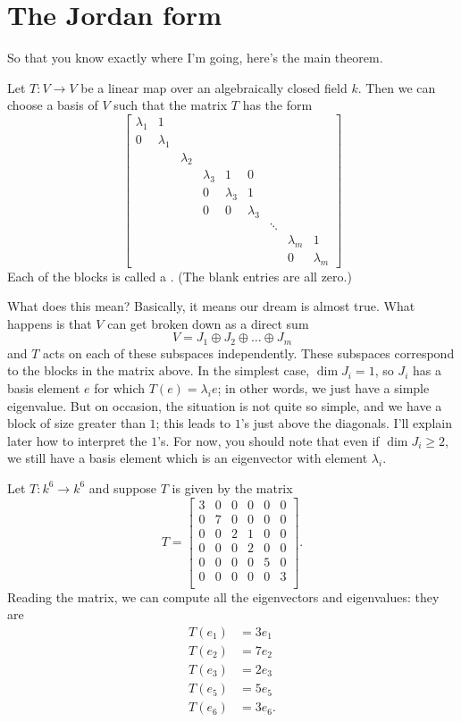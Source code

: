 \section{The Jordan form}
So that you know exactly where I'm going, here's the main theorem.
\begin{theorem}
	Let $T : V \to V$ be a linear map over an algebraically closed field $k$.
	Then we can choose a basis of $V$ such that the matrix $T$ has the form
	\[
	\begin{bmatrix}
		\lambda_1 & 1 \\
		0 & \lambda_1 \\
		&& \lambda_2 \\
		&&& \lambda_3 & 1 & 0 \\
		&&& 0 & \lambda_3 & 1 \\
		&&& 0 & 0 & \lambda_3 \\
		&&&&&& \ddots \\
		&&&&&&& \lambda_m & 1 \\
		&&&&&&& 0 & \lambda_m
	\end{bmatrix}
	\]
	Each of the blocks is called a .
	(The blank entries are all zero.)
\end{theorem}

What does this mean?
Basically, it means our dream is almost true.
What happens is that $V$ can get broken down as a direct sum
\[ V = J_1 \oplus J_2 \oplus \dots \oplus J_m \]
and $T$ acts on each of these subspaces independently.
These subspaces correspond to the blocks in the matrix above.
In the simplest case, $\dim J_i = 1$, so $J_i$ has a basis element $e$ for which $T(e) = \lambda_i e$;
in other words, we just have a simple eigenvalue.
But on occasion, the situation is not quite so simple, and we have a block of size greater than $1$;
this leads to $1$'s just above the diagonals.
I'll explain later how to interpret the $1$'s.
For now, you should note that even if $\dim J_i \ge 2$, we still have a basis element
which is an eigenvector with element $\lambda_i$.

\begin{example}
	Let $T : k^6 \to k^6$ and suppose $T$ is given by the matrix
	\[ 
		T = \begin{bmatrix}
			3 & 0 & 0 & 0 & 0 & 0 \\
			0 & 7 & 0 & 0 & 0 & 0 \\
			0 & 0 & 2 & 1 & 0 & 0 \\
			0 & 0 & 0 & 2 & 0 & 0 \\
			0 & 0 & 0 & 0 & 5 & 0 \\
			0 & 0 & 0 & 0 & 0 & 3 \\
		\end{bmatrix}.
	\]
	Reading the matrix, we can compute all the eigenvectors and eigenvalues:
	they are
	\begin{align*}
		T(e_1) &= 3e_1 \\
		T(e_2) &= 7e_2 \\
		T(e_3) &= 2e_3 \\
		T(e_5) &= 5e_5 \\
		T(e_6) &= 3e_6.
	\end{align*}
\end{example}

